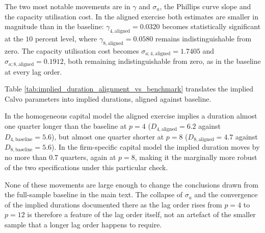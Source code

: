\documentclass[12pt, a4paper]{article}
\begin{document}
\begin{appendices}
    {}
    {\noindent{}}
\FloatBarrier

The two most notable movements are in $\gamma$ and $\sigma_a$, the Phillips curve slope and the capacity
utilisation cost. In the aligned exercise both estimates are smaller in magnitude than in the baseline:
$\gamma_{4,\text{aligned}} = 0.0320$ becomes statistically significant at the $10$ percent level, where
$\gamma_{8,\text{aligned}} = 0.0580$ remains indistinguishable from zero. The capacity utilisation cost becomes
$\sigma_{a;4,\text{aligned}} = 1.7405$ and $\sigma_{a;8,\text{aligned}} = 0.1912$, both remaining
indistinguishable from zero, as in the baseline at every lag order.

Table \ref{tab:implied_duration_alignment_vs_benchmark} translates the implied Calvo parameters into implied
durations, aligned against baseline.

    {}
    {\noindent{}}
\FloatBarrier

In the homogeneous capital model the aligned exercise implies a duration almost one quarter longer than the
baseline at $p = 4$ ($D_{4,\text{aligned}} = 6.2$ against $D_{4,\text{baseline}} = 5.6$), but almost one
quarter shorter at $p = 8$ ($D_{8,\text{aligned}} = 4.7$ against $D_{8,\text{baseline}} = 5.6$). In the
firm-specific capital model the implied duration moves by no more than $0.7$ quarters, again at $p = 8$, making
it the marginally more robust of the two specifications under this particular check.

None of these movements are large enough to change the conclusions drawn from the full-sample baseline in the
main text. The collapse of $\sigma_a$ and the convergence of the implied durations documented there as the lag
order rises from $p=4$ to $p=12$ is therefore a feature of the lag order itself, not an artefact of the smaller
sample that a longer lag order happens to require.

\end{appendices}
\end{document}
